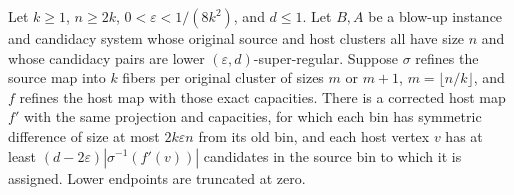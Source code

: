 \begin{lemma}
Let $k\geq1$, $n\geq2k$, $0<\varepsilon<1/(8k^2)$, and $d\leq1$.
Let $B,A$ be a blow-up instance and candidacy system whose original
source and host clusters all have size $n$ and whose candidacy pairs
are lower $(\varepsilon,d)$-super-regular. Suppose $\sigma$ refines
the source map into $k$ fibers per original cluster of sizes
$m$ or $m+1$, $m=\lfloor n/k\rfloor$, and $f$ refines the host
map with those exact capacities. There is a corrected host map $f'$
with the same projection and capacities, for which each bin has
symmetric difference of size at most $2k\varepsilon n$ from its
old bin, and each host vertex $v$ has at least
$(d-2\varepsilon)|\sigma^{-1}(f'(v))|$ candidates in the source
bin to which it is assigned. Lower endpoints are truncated at zero.
\end{lemma}
